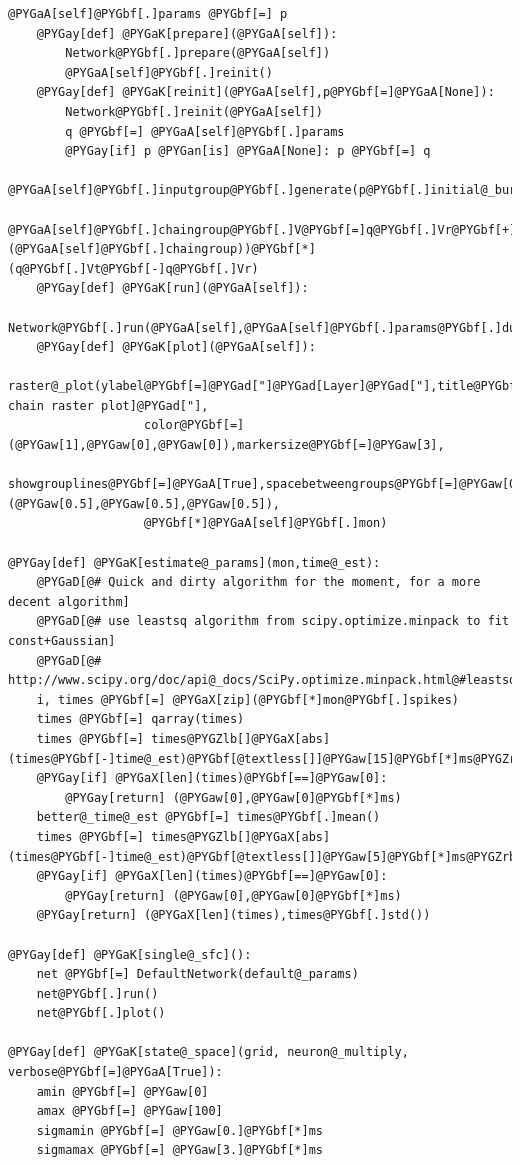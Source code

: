\documentclass[letterpaper,10pt,english]{manual}
\begin{document}
\begin{Verbatim}[commandchars=@\[\]]
        @PYGaA[self]@PYGbf[.]params @PYGbf[=] p
    @PYGay[def] @PYGaK[prepare](@PYGaA[self]):
        Network@PYGbf[.]prepare(@PYGaA[self])
        @PYGaA[self]@PYGbf[.]reinit()
    @PYGay[def] @PYGaK[reinit](@PYGaA[self],p@PYGbf[=]@PYGaA[None]):
        Network@PYGbf[.]reinit(@PYGaA[self])
        q @PYGbf[=] @PYGaA[self]@PYGbf[.]params
        @PYGay[if] p @PYGan[is] @PYGaA[None]: p @PYGbf[=] q
        @PYGaA[self]@PYGbf[.]inputgroup@PYGbf[.]generate(p@PYGbf[.]initial@_burst@_t,p@PYGbf[.]initial@_burst@_a,p@PYGbf[.]initial@_burst@_sigma)
        @PYGaA[self]@PYGbf[.]chaingroup@PYGbf[.]V@PYGbf[=]q@PYGbf[.]Vr@PYGbf[+]rand(@PYGaX[len](@PYGaA[self]@PYGbf[.]chaingroup))@PYGbf[*](q@PYGbf[.]Vt@PYGbf[-]q@PYGbf[.]Vr)
    @PYGay[def] @PYGaK[run](@PYGaA[self]):
        Network@PYGbf[.]run(@PYGaA[self],@PYGaA[self]@PYGbf[.]params@PYGbf[.]duration)
    @PYGay[def] @PYGaK[plot](@PYGaA[self]):
        raster@_plot(ylabel@PYGbf[=]@PYGad["]@PYGad[Layer]@PYGad["],title@PYGbf[=]@PYGad["]@PYGad[Synfire chain raster plot]@PYGad["],
                   color@PYGbf[=](@PYGaw[1],@PYGaw[0],@PYGaw[0]),markersize@PYGbf[=]@PYGaw[3],
                   showgrouplines@PYGbf[=]@PYGaA[True],spacebetweengroups@PYGbf[=]@PYGaw[0.2],grouplinecol@PYGbf[=](@PYGaw[0.5],@PYGaw[0.5],@PYGaw[0.5]),
                   @PYGbf[*]@PYGaA[self]@PYGbf[.]mon)

@PYGay[def] @PYGaK[estimate@_params](mon,time@_est):
    @PYGaD[@# Quick and dirty algorithm for the moment, for a more decent algorithm]
    @PYGaD[@# use leastsq algorithm from scipy.optimize.minpack to fit const+Gaussian]
    @PYGaD[@# http://www.scipy.org/doc/api@_docs/SciPy.optimize.minpack.html@#leastsq]
    i, times @PYGbf[=] @PYGaX[zip](@PYGbf[*]mon@PYGbf[.]spikes)
    times @PYGbf[=] qarray(times)
    times @PYGbf[=] times@PYGZlb[]@PYGaX[abs](times@PYGbf[-]time@_est)@PYGbf[@textless[]]@PYGaw[15]@PYGbf[*]ms@PYGZrb[]
    @PYGay[if] @PYGaX[len](times)@PYGbf[==]@PYGaw[0]:
        @PYGay[return] (@PYGaw[0],@PYGaw[0]@PYGbf[*]ms)
    better@_time@_est @PYGbf[=] times@PYGbf[.]mean()
    times @PYGbf[=] times@PYGZlb[]@PYGaX[abs](times@PYGbf[-]time@_est)@PYGbf[@textless[]]@PYGaw[5]@PYGbf[*]ms@PYGZrb[]
    @PYGay[if] @PYGaX[len](times)@PYGbf[==]@PYGaw[0]:
        @PYGay[return] (@PYGaw[0],@PYGaw[0]@PYGbf[*]ms)
    @PYGay[return] (@PYGaX[len](times),times@PYGbf[.]std())

@PYGay[def] @PYGaK[single@_sfc]():
    net @PYGbf[=] DefaultNetwork(default@_params)
    net@PYGbf[.]run()
    net@PYGbf[.]plot()

@PYGay[def] @PYGaK[state@_space](grid, neuron@_multiply, verbose@PYGbf[=]@PYGaA[True]):
    amin @PYGbf[=] @PYGaw[0]
    amax @PYGbf[=] @PYGaw[100]
    sigmamin @PYGbf[=] @PYGaw[0.]@PYGbf[*]ms
    sigmamax @PYGbf[=] @PYGaw[3.]@PYGbf[*]ms


\end{Verbatim}
\end{document}
